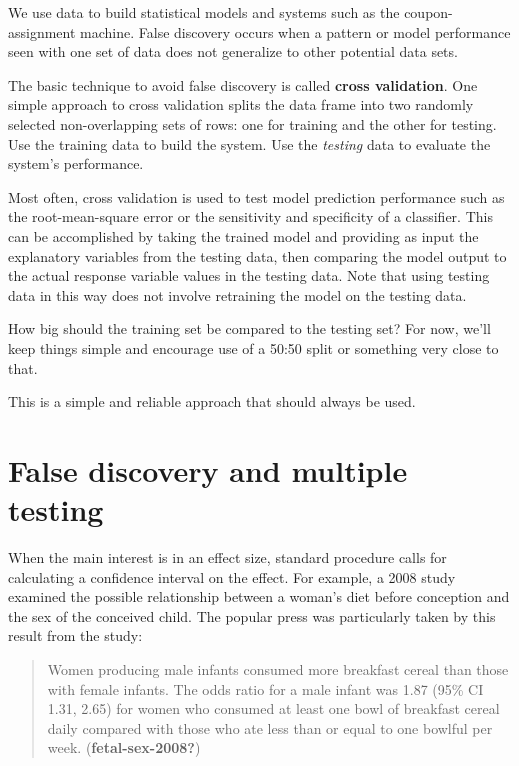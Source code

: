 \documentclass[
  letterpaper,
  DIV=11,
  numbers=noendperiod,
  oneside]{scrreprt}
\begin{document}
We use data to build statistical models and systems such as the
coupon-assignment machine. False discovery occurs when a pattern or
model performance seen with one set of data does not generalize to other
potential data sets.

The basic technique to avoid false discovery is called \textbf{cross
validation}. One simple approach to cross validation splits the data
frame into two randomly selected non-overlapping sets of rows: one for
training and the other for testing. Use the training data to build the
system. Use the \emph{testing} data to evaluate the system's
performance.

Most often, cross validation is used to test model prediction
performance such as the root-mean-square error or the sensitivity and
specificity of a classifier. This can be accomplished by taking the
trained model and providing as input the explanatory variables from the
testing data, then comparing the model output to the actual response
variable values in the testing data. Note that using testing data in
this way does not involve retraining the model on the testing data.

How big should the training set be compared to the testing set? For now,
we'll keep things simple and encourage use of a 50:50 split or something
very close to that.

This is a simple and reliable approach that should always be used.

\hypertarget{false-discovery-and-multiple-testing}{%
\section{False discovery and multiple
testing}\label{false-discovery-and-multiple-testing}}

When the main interest is in an effect size, standard procedure calls
for calculating a confidence interval on the effect. For example, a 2008
study examined the possible relationship between a woman's diet before
conception and the sex of the conceived child. The popular press was
particularly taken by this result from the study:

\begin{quote}
Women producing male infants consumed more breakfast cereal than those
with female infants. The odds ratio for a male infant was 1.87 (95\% CI
1.31, 2.65) for women who consumed at least one bowl of breakfast cereal
daily compared with those who ate less than or equal to one bowlful per
week. (\textbf{fetal-sex-2008?})
\end{quote}
\end{document}
